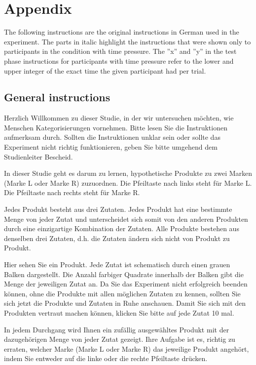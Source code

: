 \documentclass[a4paper,man,natbib]{apa6}
\begin{document}


\newpage
\section{Appendix}
The following instructions are the original instructions in German used in the experiment. The parts in italic highlight the instructions that were shown only to participants in the condition with time pressure. The ''x'' and ''y'' in the test phase instructions for participants with time pressure refer to the lower and upper integer of the exact time the given participant had per trial.

\subsection{General instructions}
Herzlich Willkommen zu dieser Studie, in der wir untersuchen möchten, wie Menschen Kategorisierungen vornehmen.
Bitte lesen Sie die Instruktionen aufmerksam durch. Sollten die Instruktionen unklar sein oder sollte das Experiment nicht richtig funktionieren, geben Sie bitte umgehend dem Studienleiter Bescheid.

In dieser Studie geht es darum zu lernen, hypothetische Produkte zu zwei Marken (Marke L oder Marke R) zuzuordnen.
Die Pfeiltaste nach links steht für Marke L. Die Pfeiltaste nach rechts steht für Marke R.

Jedes Produkt besteht aus drei Zutaten. Jedes Produkt hat eine bestimmte Menge von jeder Zutat und unterscheidet sich somit von den anderen Produkten durch eine einzigartige Kombination der Zutaten.
Alle Produkte bestehen aus denselben drei Zutaten, d.h. die Zutaten ändern sich nicht von Produkt zu Produkt.

Hier sehen Sie ein Produkt. Jede Zutat ist schematisch durch einen grauen Balken dargestellt. Die Anzahl farbiger Quadrate innerhalb der Balken gibt die Menge der jeweiligen Zutat an.
Da Sie das Experiment nicht erfolgreich beenden können, ohne die Produkte mit allen möglichen Zutaten zu kennen, sollten Sie sich jetzt die Produkte und Zutaten in Ruhe anschauen.
Damit Sie sich mit den Produkten vertraut machen können, klicken Sie bitte auf jede Zutat 10 mal.

In jedem Durchgang wird Ihnen ein zufällig ausgewähltes Produkt mit der dazugehörigen Menge von jeder Zutat gezeigt. Ihre Aufgabe ist es, richtig zu erraten, welcher Marke (Marke L oder Marke R) das jeweilige Produkt angehört, indem Sie entweder auf die linke oder die rechte Pfeiltaste drücken.
\end{document}
